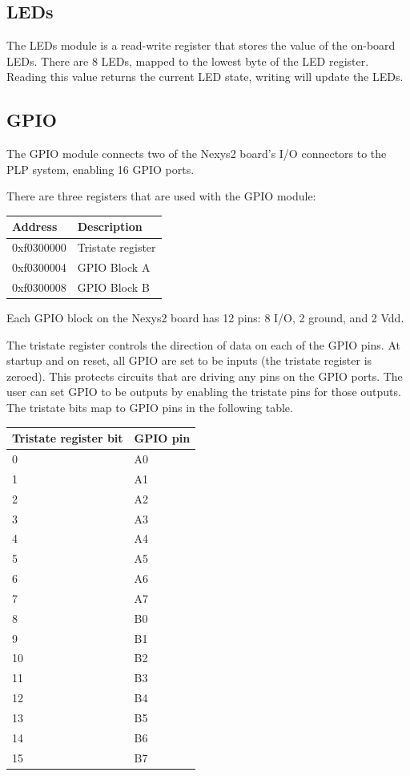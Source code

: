 \documentclass{article}
\begin{document}
\subsection{LEDs}
The LEDs module is a read-write register that stores the value of the on-board LEDs. There are 8 LEDs, mapped to the lowest byte of the LED register. Reading this value returns the current LED state, writing will update the LEDs. 
\subsection{GPIO}
The GPIO module connects two of the Nexys2 board's I/O connectors to the PLP system, enabling 16 GPIO ports.

There are three registers that are used with the GPIO module: 

\begin{tabular}{ | l | l |}
\hline
Address & Description \\
\hline
0xf0300000 & Tristate register \\
0xf0300004 & GPIO Block A \\
0xf0300008 & GPIO Block B \\
\hline
\end{tabular}

Each GPIO block on the Nexys2 board has 12 pins: 8 I/O, 2 ground, and 2 Vdd.

The tristate register controls the direction of data on each of the GPIO pins. At startup and on reset, all GPIO are set to be inputs (the tristate register is zeroed). This protects circuits that are driving any pins on the GPIO ports. The user can set GPIO to be outputs by enabling the tristate pins for those outputs. The tristate bits map to GPIO pins in the following table. 

\begin{tabular}{ | l | l |}
\hline
Tristate register bit &	GPIO pin \\
\hline
0 & A0 \\
1 & A1 \\
2 & A2 \\
3 & A3 \\
4 & A4 \\
5 & A5 \\
6 & A6 \\
7 & A7 \\
8 & B0 \\
9 & B1 \\
10 & B2 \\
11 & B3 \\
12 & B4 \\
13 & B5 \\
14 & B6 \\
15 & B7 \\
\hline
\end{tabular}
\end{document}
